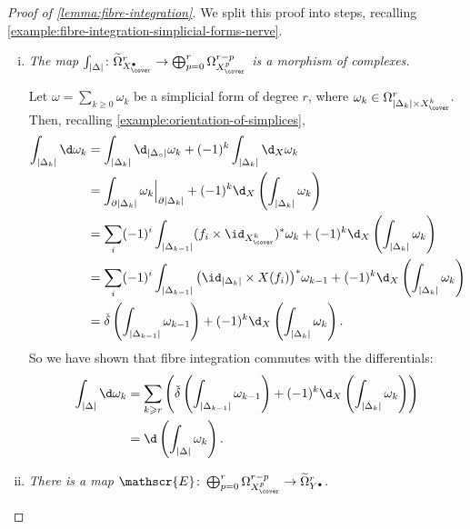         \begin{proof}[Proof of \cref{lemma:fibre-integration}]
            We split this proof into steps, recalling \cref{example:fibre-integration-simplicial-forms-nerve}.
            \begin{enumerate}[(i)]
                \item \emph{The map $\int_{|\Delta|}\colon\widetilde{\Omega}_{X^\bullet_\cover}^r\to\bigoplus_{p=0}^r\Omega_{X^p_\cover}^{r-p}$ is a morphism of complexes.}

                    Let $\omega=\sum_{k\geqslant0}\omega_{k}$ be a simplicial form of degree $r$, where $\omega_k\in\Omega^r_{|\Delta_k|\times X^k_\cover}$.
                    Then, recalling \cref{example:orientation-of-simplices},
                    \begin{align*}
                        \int_{|\Delta_k|}\d\omega_k &= \int_{|\Delta_k|}\d_{|\Delta_\circ|}\omega_k + (-1)^k\int_{|\Delta_k|}\d_X\omega_k\\
                        &= \int_{\partial|\Delta_k|}\omega_k\Big|_{\partial|\Delta_k|} + (-1)^k \d_X\left(\int_{|\Delta_k|}\omega_k\right)\\
                        &= \sum_i(-1)^i\int_{|\Delta_{k-1}|}(f_i\times\id_{X^k_\cover})^*\omega_k + (-1)^k\d_X\left(\int_{|\Delta_k|}\omega_k\right)\\
                        &= \sum_i(-1)^i\int_{|\Delta_{k-1}|}\big(\id_{|\Delta_k|}\times X(f_i)\big)^*\omega_{k-1} + (-1)^k\d_X\left(\int_{|\Delta_k|}\omega_k\right)\\
                        &= \check\delta\left(\int_{|\Delta_{k-1}|}\omega_{k-1}\right) + (-1)^k\d_X\left(\int_{|\Delta_k|}\omega_k\right).
                    \end{align*}
                    So we have shown that fibre integration commutes with the differentials:
                    \begin{align*}
                        \int_{|\Delta|}\d\omega_k &= \sum_{k\geqslant r}\left( \check\delta\left( \int_{|\Delta_{k-1}|}\omega_{k-1} \right) + (-1)^k\d_X\left( \int_{|\Delta_k|}\omega_k \right) \right)\\
                        &= \d\left(\int_{|\Delta|}\omega_k\right).
                    \end{align*}

                \item \emph{There is a map $\mathscr{E}\colon\bigoplus_{p=0}^r\Omega_{X^p_\cover}^{r-p}\to\widetilde{\Omega}_{Y^\bullet}^r$.}


\end{enumerate}
\end{proof}

